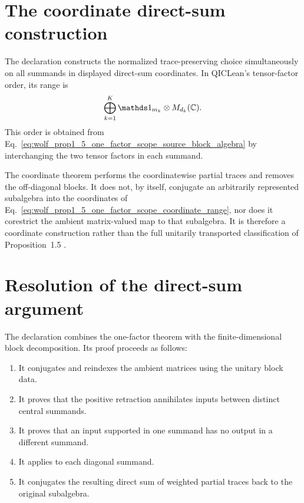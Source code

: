 \documentclass{article}
\begin{document}
\section{The coordinate direct-sum construction}

The declaration
constructs the normalized trace-preserving choice simultaneously on all
summands in displayed direct-sum coordinates. In QICLean's tensor-factor
order, its range is
\begin{align}
    \bigoplus_{k=1}^{K}
        \one_{m_k}\otimes M_{d_k}(\mathbb C).
    \label{eq:wolf_prop1_5_one_factor_scope_coordinate_range}
\end{align}
This order is obtained from
Eq.~\ref{eq:wolf_prop1_5_one_factor_scope_source_block_algebra} by
interchanging the two tensor factors in each summand.

The coordinate theorem performs the coordinatewise partial traces and removes
the off-diagonal blocks. It does not, by itself, conjugate an arbitrarily
represented subalgebra into the coordinates of
Eq.~\ref{eq:wolf_prop1_5_one_factor_scope_coordinate_range}, nor does it
corestrict the ambient matrix-valued map to that subalgebra. It is therefore a
coordinate construction rather than the full unitarily transported
classification of Proposition~1.5 \cite{Wolf2012Quantum}.

\section{Resolution of the direct-sum argument}

The declaration
 combines
the one-factor theorem with the finite-dimensional block decomposition. Its
proof proceeds as follows:
\begin{enumerate}
    \item It conjugates and reindexes the ambient matrices using the unitary
          block data.
    \item It proves that the positive retraction annihilates inputs between
          distinct central summands.
    \item It proves that an input supported in one summand has no output in a
          different summand.
    \item It applies
          to each diagonal summand.
    \item It conjugates the resulting direct sum of weighted partial traces
          back to the original subalgebra.
\end{enumerate}
\end{document}
